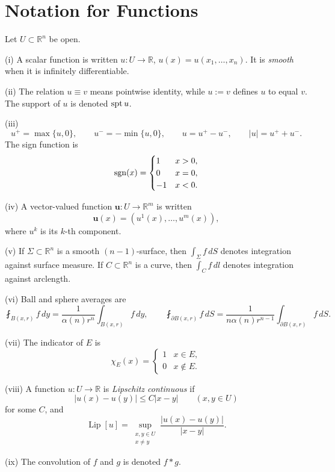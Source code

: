 \section{Notation for Functions}
\label{sec:notation-for-functions}

\begin{definition}
\label{def:function-notation-basic}

Let $U\subset\mathbb R^n$ be open.

(i) A scalar function is written $u:U\to\mathbb R$, $u(x)=u(x_1,\ldots,x_n)$. It is \textit{smooth} when it is infinitely differentiable.

(ii) The relation $u\equiv v$ means pointwise identity, while $u:=v$ defines $u$ to equal $v$. The support of $u$ is denoted $\operatorname{spt} u$.

(iii)
\[
u^+=\max\{u,0\},
\qquad
u^-=-\min\{u,0\},
\qquad
u=u^+-u^-,
\qquad
|u|=u^++u^-.
\]
The sign function is
\[
\operatorname{sgn}(x)=
\begin{cases}
1 & x>0,\\
0 & x=0,\\
-1 & x<0.
\end{cases}
\]

(iv) A vector-valued function $\mathbf u:U\to\mathbb R^m$ is written
\[
\mathbf u(x)=(u^1(x),\ldots,u^m(x)),
\]
where $u^k$ is its $k$-th component.

(v) If $\Sigma\subset\mathbb R^n$ is a smooth $(n-1)$-surface, then $\int_\Sigma f\,dS$ denotes integration against surface measure. If $C\subset\mathbb R^n$ is a curve, then $\int_C f\,dl$ denotes integration against arclength.

(vi) Ball and sphere averages are
\[
\fint_{B(x,r)}f\,dy
=\frac{1}{\alpha(n)r^n}\int_{B(x,r)}f\,dy,
\qquad
\fint_{\partial B(x,r)}f\,dS
=\frac{1}{n\alpha(n)r^{n-1}}\int_{\partial B(x,r)}f\,dS.
\]

(vii) The indicator of $E$ is
\[
\chi_E(x)=
\begin{cases}
1 & x\in E,\\
0 & x\notin E.
\end{cases}
\]

(viii) A function $u:U\to\mathbb R$ is \textit{Lipschitz continuous} if
\[
|u(x)-u(y)|\leq C|x-y|\qquad(x,y\in U)
\]
for some $C$, and
\[
\operatorname{Lip}[u]
=\sup_{\substack{x,y\in U\\x\ne y}}
\frac{|u(x)-u(y)|}{|x-y|}.
\]

(ix) The convolution of $f$ and $g$ is denoted $f*g$.
\end{definition}

